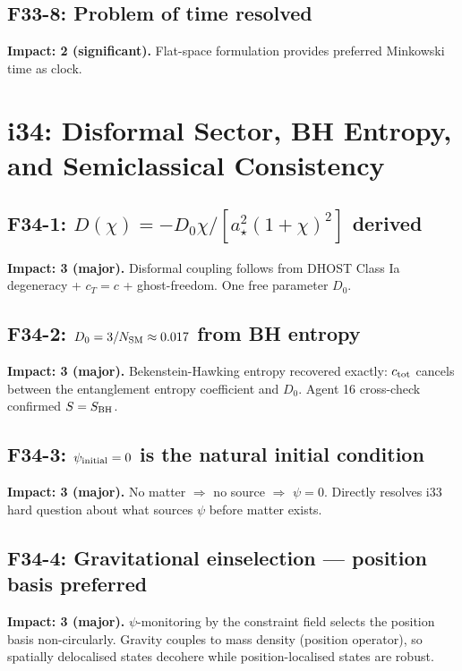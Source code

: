 \documentclass[11pt,a4paper]{article}
\begin{document}
\subsection{F33-8: Problem of time resolved}
\textbf{Impact: 2 (significant).} Flat-space formulation provides preferred Minkowski time as clock.

\section{i34: Disformal Sector, BH Entropy, and Semiclassical Consistency}
\label{sec:i34}

\subsection{F34-1: $D(\chi) = -D_0\chi/[a_\star^2(1+\chi)^2]$ derived}
\textbf{Impact: 3 (major).} Disformal coupling follows from DHOST Class Ia degeneracy + $c_T = c$ + ghost-freedom. One free parameter $D_0$.

\subsection{F34-2: $D_0 = 3/N_{\rm SM} \approx 0.017$ from BH entropy}
\textbf{Impact: 3 (major).} Bekenstein-Hawking entropy recovered exactly: $c_{\rm tot}$ cancels between the entanglement entropy coefficient and $D_0$. Agent 16 cross-check confirmed $S = S_{\rm BH}$.

\subsection{F34-3: $\psi_{\rm initial} = 0$ is the natural initial condition}
\textbf{Impact: 3 (major).} No matter $\Rightarrow$ no source $\Rightarrow$ $\psi = 0$. Directly resolves i33 hard question about what sources $\psi$ before matter exists.

\subsection{F34-4: Gravitational einselection --- position basis preferred}
\textbf{Impact: 3 (major).} $\psi$-monitoring by the constraint field selects the position basis non-circularly. Gravity couples to mass density (position operator), so spatially delocalised states decohere while position-localised states are robust.
\end{document}
